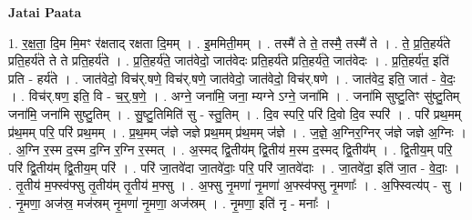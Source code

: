 \documentclass[17pt]{extarticle}
\begin{document}
\textbf{Jatai Paata} \newline

1. र॒क्ष॒ता॒ दि॒म मि॒मꣳ र॑क्षताद् रक्षता दि॒मम् । . इ॒ममिती॒मम् । . तस्मै॑ ते ते॒ तस्मै॒ तस्मै॑ ते । . ते॒ प्र॒ति॒हर्य॑ते प्रति॒हर्य॑ते ते ते प्रति॒हर्य॑ते । . प्र॒ति॒हर्य॑ते॒ जात॑वेदो॒ जात॑वेदः प्रति॒हर्य॑ते प्रति॒हर्य॑ते॒ जात॑वेदः । . प्र॒ति॒हर्य॑त॒ इति॑ प्रति - हर्य॑ते । . जात॑वेदो॒ विच॑र्.षणे॒ विच॑र्.षणे॒ जात॑वेदो॒ जात॑वेदो॒ विच॑र्.षणे । . जात॑वेद॒ इति॒ जात॑ - वे॒दः॒ । . विच॑र्.षण॒ इति॒ वि - च॒र्॒.ष॒णे॒ । . अग्ने॒ जना॑मि॒ जना॒ म्यग्ने ऽग्ने॒ जना॑मि । . जना॑मि सुष्टु॒तिꣳ सु॑ष्टु॒तिम् जना॑मि॒ जना॑मि सुष्टु॒तिम् । . सु॒ष्टु॒तिमिति॑ सु - स्तु॒तिम् । . दि॒व स्परि॒ परि॑ दि॒वो दि॒व स्परि॑ । . परि॑ प्रथ॒मम् प्र॑थ॒मम् परि॒ परि॑ प्रथ॒मम् । . प्र॒थ॒मम् ज॑ज्ञे जज्ञे प्रथ॒मम् प्र॑थ॒मम् ज॑ज्ञे । . ज॒ज्ञे॒ अ॒ग्निर॒ग्निर् ज॑ज्ञे जज्ञे अ॒ग्निः । . अ॒ग्नि र॒स्म द॒स्म द॒ग्नि र॒ग्नि र॒स्मत् । . अ॒स्मद् द्वि॒तीय॑म् द्वि॒तीय॑ म॒स्म द॒स्मद् द्वि॒तीय᳚म् । . द्वि॒तीय॒म् परि॒ परि॑ द्वि॒तीय॑म् द्वि॒तीय॒म् परि॑ । . परि॑ जा॒तवे॑दा जा॒तवे॑दाः॒ परि॒ परि॑ जा॒तवे॑दाः । . जा॒तवे॑दा॒ इति॑ जा॒त - वे॒दाः॒ । . तृ॒तीय॑ म॒फ्स्व॑फ्सु तृ॒तीय॑म् तृ॒तीय॑ म॒फ्सु । . अ॒फ्सु नृ॒मणा॑ नृ॒मणा॑ अ॒फ्स्व॑फ्सु नृ॒मणाः᳚ । . अ॒फ्स्वित्य॑प् - सु । . नृ॒मणा॒ अज॑स्र॒ मज॑स्रम् नृ॒मणा॑ नृ॒मणा॒ अज॑स्रम् । . नृ॒मणा॒ इति॑ नृ - मनाः᳚ । \newline
\end{document}
